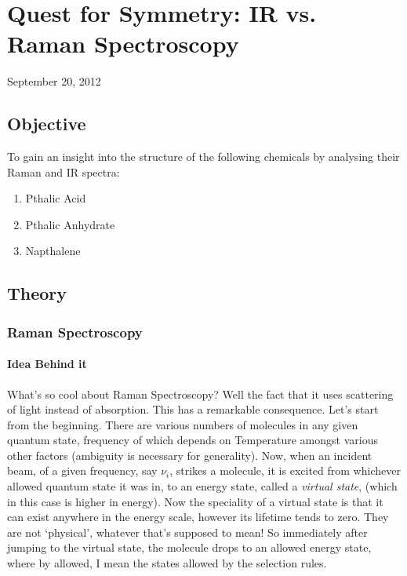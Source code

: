 \chapter{Quest for Symmetry: IR vs. Raman Spectroscopy}
\begin{flushright}
September 20, 2012
\end{flushright}
\section{Objective}
To gain an insight into the structure of the following chemicals by analysing their Raman and IR spectra:
\begin{enumerate}
	\item Pthalic Acid
	\item Pthalic Anhydrate	
	\item Napthalene
\end{enumerate}

\section{Theory}
\subsection {Raman Spectroscopy}
	\subsubsection*{Idea Behind it}
	What's so cool about Raman Spectroscopy? Well the fact that it uses scattering of light instead of absorption. This has a remarkable consequence. Let's start from the beginning. There are various numbers of molecules in any given quantum state, frequency of which depends on Temperature amongst various other factors (ambiguity is necessary for generality). Now, when an incident beam, of a given frequency, say $\nu_{i}$, strikes a molecule, it is excited from whichever allowed quantum state it was in, to an energy state, called a \emph{virtual state}, (which in this case is higher in energy). Now the speciality of a virtual state is that it can exist anywhere in the energy scale, however its lifetime tends to zero. They are not `physical', whatever that's supposed to mean! So immediately after jumping to the virtual state, the molecule drops to an allowed energy state, where by allowed, I mean the states allowed by the selection rules.
	
